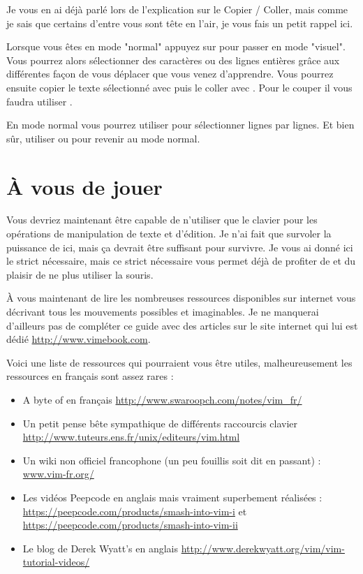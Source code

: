 Je vous en ai déjà parlé lors de l'explication sur le Copier / Coller, mais comme je sais que certains d'entre vous sont tête en l'air, je vous fais un petit rappel ici.

Lorsque vous êtes en mode "normal" appuyez sur \ttv pour passer en mode "visuel". Vous pourrez alors sélectionner des caractères ou des lignes entières grâce aux différentes façon de vous déplacer que vous venez d'apprendre. Vous pourrez ensuite copier le texte sélectionné avec \tty\xspace puis le coller avec \ttp. Pour le couper il vous faudra utiliser \ttd.

En mode normal vous pourrez utiliser \ttV pour sélectionner lignes par lignes. Et bien sûr, utiliser \ttesc ou \vimcmd{;;} pour revenir au mode normal.

\section{À vous de jouer}

Vous devriez maintenant être capable de n'utiliser que le clavier pour les opérations de manipulation de texte et d'édition. Je n'ai fait que survoler la puissance de \vim ici, mais ça devrait être suffisant pour survivre. Je vous ai donné ici le strict nécessaire, mais ce strict nécessaire vous permet déjà de profiter de \vim et du plaisir de ne plus utiliser la souris.

À vous maintenant de lire les nombreuses ressources disponibles sur internet vous décrivant tous les mouvements possibles et imaginables. Je ne manquerai d'ailleurs pas de compléter ce guide avec des articles sur le site internet qui lui est dédié \url{http://www.vimebook.com}.

\bigskip
Voici une liste de ressources qui pourraient vous être utiles, malheureusement les ressources en français sont assez rares :

\begin{itemize}
    \item A byte of \vim en français \url{http://www.swaroopch.com/notes/vim_fr/}
    \item Un petit pense bête sympathique de différents raccourcis clavier \url{http://www.tuteurs.ens.fr/unix/editeurs/vim.html}
    \item Un wiki non officiel francophone (un peu fouillis soit dit en passant) : \url{www.vim-fr.org/}
    \item Les vidéos Peepcode en anglais mais vraiment superbement réalisées : \url{https://peepcode.com/products/smash-into-vim-i} et \url{https://peepcode.com/products/smash-into-vim-ii}
    \item Le blog de Derek Wyatt's en anglais \url{http://www.derekwyatt.org/vim/vim-tutorial-videos/}
\end{itemize}


